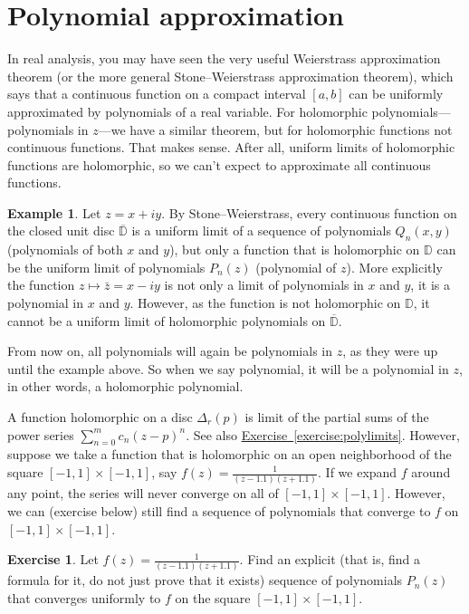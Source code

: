 \documentclass[12pt,openany]{book}
\newcommand{\D}{{\mathbb{D}}}
\theoremstyle{plain}
\theoremstyle{remark}
\theoremstyle{definition}
\newenvironment{exbox}{%
    \def\FrameCommand{\vrule width 1pt \relax\hspace{10pt}}%
    \MakeFramed{\advance\hsize-\width\FrameRestore}%
}{%
    \endMakeFramed
}
\theoremstyle{exercise}
\newtheorem{exercise}{Exercise}[section]
\theoremstyle{example}
\newtheorem{example}[thm]{Example}
\newcommand{\exerciseref}[1]{\hyperref[#1]{Exercise~\ref*{#1}}}
\begin{document}

\section{Polynomial approximation}
\label{sec:polyapprox}

In real analysis, you may have seen the very useful
Weierstrass approximation theorem (or the more general
Stone--Weierstrass approximation theorem), which says that a continuous function
on a compact interval $[a,b]$ can be uniformly approximated by polynomials
of a real variable.  For holomorphic polynomials---polynomials in $z$---we have a
similar theorem, but for holomorphic functions not
continuous functions.  That makes sense.  After all, uniform limits of
holomorphic functions are holomorphic, so we can't expect to approximate all
continuous functions.

\begin{example}
Let $z = x+iy$.
By Stone--Weierstrass,
every continuous function on the closed unit disc $\overline{\D}$
is a uniform limit of a sequence of polynomials
$Q_n(x,y)$ (polynomials of both $x$ and $y$), but only a function that is
holomorphic on $\D$ can be the uniform limit of polynomials
$P_n(z)$ (polynomial of $z$).
More explicitly the function $z \mapsto \bar{z}=x-iy$ is not only a limit of
polynomials in $x$ and $y$, it is a polynomial in $x$ and $y$.  However, as
the function is not holomorphic on $\D$, it cannot be a
uniform limit of holomorphic polynomials on $\overline{\D}$.
\end{example}

From now on, all polynomials will again be polynomials in $z$, as they were
up until the example above.  So when we say polynomial, it will be
a polynomial in $z$, in other words, a holomorphic polynomial.

A function holomorphic on a disc $\Delta_r(p)$ is limit of the partial sums
of the power series $\sum_{n=0}^m c_n {(z-p)}^n$.  See also
\exerciseref{exercise:polylimits}.  However, suppose we take a function that
is holomorphic on an open neighborhood of the square $[-1,1] \times [-1,1]$, say
$f(z) = \frac{1}{(z-1.1)(z+1.1)}$.  If we expand $f$ around any point, the
series will never converge on all of $[-1,1] \times [-1,1]$.  However, we can
(exercise below) still find a sequence of polynomials that converge to $f$
on $[-1,1] \times [-1,1]$.

\begin{exbox}
\begin{exercise}
Let 
$f(z) = \frac{1}{(z-1.1)(z+1.1)}$.  Find an explicit (that is, find a
formula for it, do not just prove that it exists) sequence of polynomials
$P_n(z)$
that converges uniformly to $f$ on the square $[-1,1] \times [-1,1]$.
\end{exercise}
\end{exbox}
\end{document}
